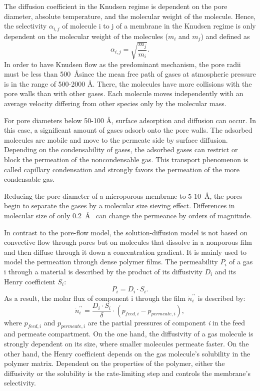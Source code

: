 \documentclass[AMA,STIX2COL]{WileyNJD-v2} %
\begin{document}
The diffusion coefficient in the Knudsen regime is dependent on the pore diameter, absolute temperature, and the molecular weight of the molecule. Hence, the selectivity $\alpha_{i,j}$ of molecule i to j of a membrane in the Knudsen regime is only dependent on the molecular weight of the molecules ($m_i$ and $m_j$) and defined as
\begin{equation}
    \alpha_{i,j}=\sqrt{\frac{m_j}{m_i}}.
\end{equation}
In order to have Knudsen flow as the predominant mechanism, the pore radii must be less than 500~\AA since the mean free path of gases at atmospheric pressure is in the range of 500-2000 \AA. There, the molecules have more collisions with the pore walls than with other gases. Each molecule moves independently with an average velocity differing from other species only by the molecular mass.

For pore diameters below 50-100 \AA, surface adsorption and diffusion can occur. In this case, a significant amount of gases adsorb onto the pore walls. The adsorbed molecules are mobile and move to the permeate side by surface diffusion. Depending on the condensability of gases, the adsorbed gases can restrict or block the permeation of the noncondensable gas. This transport phenomenon is called capillary condensation and strongly favors the permeation of the more condensable gas.

Reducing the pore diameter of a microporous membrane to 5-10~\AA, the pores begin to separate the gases by a molecular size sieving effect. Differences in molecular size of only 0.2~\AA~ can change the permeance by orders of magnitude.\cite{baker2012membrane}

In contrast to the pore-flow model, the solution-diffusion model is not based on convective flow through pores but on molecules that dissolve in a nonporous film and then diffuse through it down a concentration gradient. It is mainly used to model the permeation through dense polymer films. The permeability $P_i$ of a gas i through a material is described by the product of its diffusivity $D_i$ and its Henry coefficient $S_i$:
\begin{equation}
    P_i = D_i \cdot S_i.
\end{equation}
As a result, the molar flux of component i through the film $\dot{n}_i^{\prime \prime}$ is described by:
\begin{equation}
    \dot{n}_i^{\prime \prime}=\frac{D_i \cdot S_i}{\delta} \cdot\left(p_{feed,i} - p_{permeate,i}\right),
\end{equation}
where $p_{feed,i} $ and $ p_{permeate,i}$ are the partial pressures of component \textit{i} in the feed and permeate compartment. On the one hand, the diffusivity of a gas molecule is strongly dependent on its size, where smaller molecules permeate faster. On the other hand, the Henry coefficient depends on the gas molecule's solubility in the polymer matrix. Dependent on the properties of the polymer, either the diffusivity or the solubility is the rate-limiting step and controls the membrane's selectivity.\cite{baker2012membrane}
\end{document}

